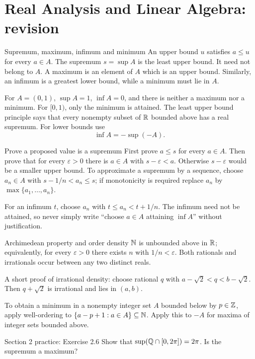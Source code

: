 \clearpage
\setcounter{section}{1}
\section{Real Analysis and Linear Algebra: revision}

\begin{note}{Supremum, maximum, infimum and minimum}
An upper bound $u$ satisfies $a\le u$ for every $a\in A$. The supremum $s=\sup A$ is the least upper bound. It need not belong to $A$. A maximum is an element of $A$ which is an upper bound. Similarly, an infimum is a greatest lower bound, while a minimum must lie in $A$.

For $A=(0,1)$, $\sup A=1$, $\inf A=0$, and there is neither a maximum nor a minimum. For $[0,1)$, only the minimum is attained. The least upper bound principle says that every nonempty subset of $\mathbb R$ bounded above has a real supremum. For lower bounds use
\[\inf A=-\sup(-A).\]
\end{note}
\begin{method}{Prove a proposed value is a supremum}
First prove $a\le s$ for every $a\in A$. Then prove that for every $\varepsilon>0$ there is $a\in A$ with $s-\varepsilon<a$. Otherwise $s-\varepsilon$ would be a smaller upper bound. To approximate a supremum by a sequence, choose $a_n\in A$ with $s-1/n<a_n\le s$; if monotonicity is required replace $a_n$ by $\max\{a_1,\ldots,a_n\}$.

For an infimum $t$, choose $a_n$ with $t\le a_n<t+1/n$. The infimum need not be attained, so never simply write ``choose $a\in A$ attaining $\inf A$'' without justification.
\end{method}
\begin{note}{Archimedean property and order density}
$\mathbb N$ is unbounded above in $\mathbb R$; equivalently, for every $\varepsilon>0$ there exists $n$ with $1/n<\varepsilon$. Both rationals and irrationals occur between any two distinct reals.

A short proof of irrational density: choose rational $q$ with $a-\sqrt2<q<b-\sqrt2$. Then $q+\sqrt2$ is irrational and lies in $(a,b)$.

To obtain a minimum in a nonempty integer set $A$ bounded below by $p\in\mathbb Z$, apply well-ordering to $\{a-p+1:a\in A\}\subseteq\mathbb N$. Apply this to $-A$ for maxima of integer sets bounded above.
\end{note}
\begin{exam}{Section 2 practice: Exercise 2.6}
Show that $\sup(\mathbb Q\cap[0,2\pi])=2\pi$. Is the supremum a maximum?
\end{exam}
